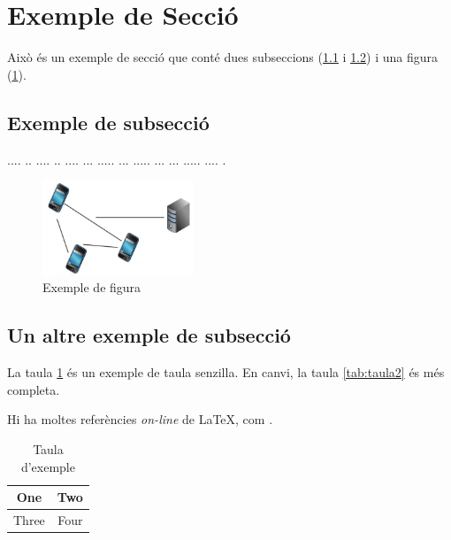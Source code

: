 ﻿\documentclass[10pt,a4paper,twocolumn,twoside]{article}
\begin{document}
\section{Exemple de Secció}

Això és un exemple de secció que conté dues subseccions (\ref{subsec-exemple1} i \ref{subsec-exemple2}) i una figura (\ref{fig-exemple}).

\subsection{Exemple de subsecció}
\label{subsec-exemple1}

.... ..  .... .. .... ... ..... ... ..... ... ... ..... .... .


\begin{figure}[!h]
\centering
	\includegraphics[width=0.4\textwidth]{img/adhoc_dtn}
	\caption{Exemple de figura}
	\label{fig-exemple}
\end{figure}

\subsection{Un altre exemple de subsecció}
\label{subsec-exemple2}

La taula \ref{tab:senzilla} és un exemple de taula senzilla. En canvi, la taula \ref{tab:taula2} és més completa.

Hi ha moltes referències \textit{on-line} de \LaTeX, com \cite{latex}.

\begin{table}
\caption{Taula d'exemple}
\label{tab:senzilla}
\begin{center}
\begin{tabular}{|c|c|}
\hline
One & Two\\
\hline
Three & Four\\
\hline
\end{tabular}
\end{center}
\end{table}
\end{document}
